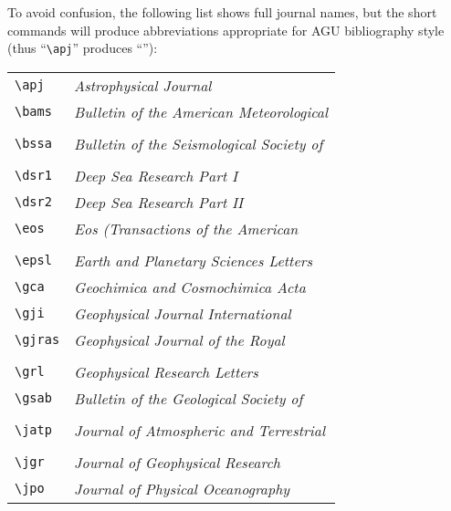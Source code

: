 \begin{article}
To avoid confusion, the following list shows full 
journal names, but the short commands will produce 
abbreviations appropriate for AGU bibliography 
style (thus ``\verb"\apj"'' produces ``\apj''):
\vspace{-10pt}
\begin{center}\begin{tabular}{ll}
\verb"\apj"    & {\it Astrophysical Journal}\\
\verb"\bams"   & {\it Bulletin of the American Meteorological}\\
               & \hspace{2em}{\it Society}\\
\verb"\bssa"   & {\it Bulletin of the Seismological Society of}\\
               & \hspace{2em}{\it America}\\
\verb"\dsr1"   & {\it Deep Sea Research Part I}\\
\verb"\dsr2"   & {\it Deep Sea Research Part II}\\
\verb"\eos"    & {\it Eos (Transactions of the American}\\
               & \hspace{2em}{\it Geophysical Union)}\\
\verb"\epsl"   & {\it Earth and Planetary Sciences Letters}\\
\verb"\gca"    & {\it Geochimica and Cosmochimica Acta}\\
\verb"\gji"    & {\it Geophysical Journal International}\\
\verb"\gjras"  & {\it Geophysical Journal of the Royal}\\
               & \hspace{2em}{\it Astronomical Society}\\
\verb"\grl"    & {\it Geophysical Research Letters}\\
\verb"\gsab"   & {\it Bulletin of the Geological Society of}\\
               & \hspace{2em}{\it America}\\
\verb"\jatp"   & {\it Journal of Atmospheric and Terrestrial}\\
               & \hspace{2em}{\it Physics}\\
\verb"\jgr"    & {\it Journal of Geophysical Research}\\
\verb"\jpo"    & {\it Journal of Physical Oceanography}\\

\end{tabular}
\end{center}
\end{article}
